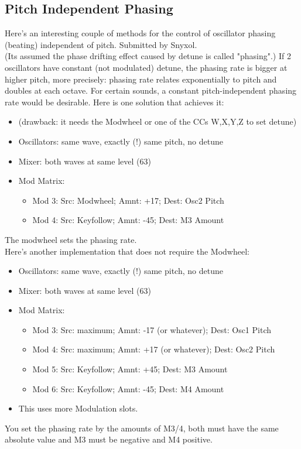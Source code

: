 \subsection{Pitch Independent Phasing}
Here's an interesting couple of methods for the control of oscillator phasing (beating) independent of pitch. Submitted by Snyxol.\\
(Its assumed the phase drifting effect caused by detune is called "phasing".)
If 2 oscillators have constant (not modulated) detune, the phasing rate is bigger at higher pitch, more precisely: phasing rate relates exponentially to pitch and doubles at each octave.
For certain sounds, a constant pitch-independent phasing rate would be desirable.
Here is one solution that achieves it:
\begin{itemize}
	\item (drawback: it needs the Modwheel or one of the CCs W,X,Y,Z to set detune)
	\item Oscillators: same wave, exactly (!) same pitch, no detune
	\item Mixer: both waves at same level (63)
	\item Mod Matrix:
	\begin{itemize}
		\item Mod 3: Src: Modwheel; Amnt: +17; Dest: Osc2 Pitch
		\item Mod 4: Src: Keyfollow; Amnt: -45; Dest: M3 Amount
	\end{itemize}
\end{itemize}
The modwheel sets the phasing rate.\\
Here's another implementation that does not require the Modwheel:
\begin{itemize}
	\item Oscillators: same wave, exactly (!) same pitch, no detune
	\item Mixer: both waves at same level (63)
	\item Mod Matrix:
	\begin{itemize}
		\item Mod 3: Src: maximum; Amnt: -17 (or whatever); Dest: Osc1 Pitch
		\item Mod 4: Src: maximum; Amnt: +17 (or whatever); Dest: Osc2 Pitch
		\item Mod 5: Src: Keyfollow; Amnt: +45; Dest: M3 Amount
		\item Mod 6: Src: Keyfollow; Amnt: -45; Dest: M4 Amount
	\end{itemize}
	\item This uses more Modulation slots.
\end{itemize}
You set the phasing rate by the amounts of M3/4, both must have the same absolute value and M3 must be negative and M4 positive.
